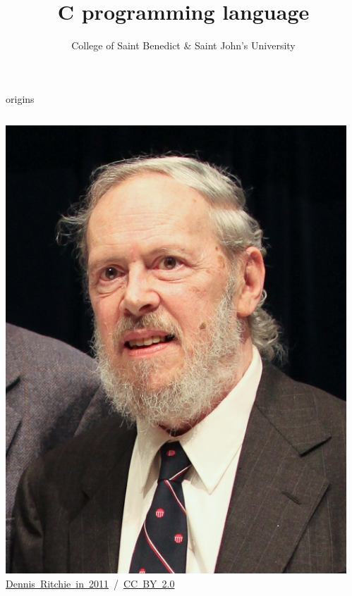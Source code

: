 \documentclass[10pt,t,svgnames]{beamer}
\title{C programming language}
\date{}
\author{College of Saint Benedict \& Saint John's University}
\begin{document}
  \maketitle

  \begin{frame}{origins}
    \vspace{3ex}
    \begin{columns}
      \begin{column}{.38425\textwidth}
        \includegraphics[width=\textwidth]{Dennis_Ritchie_2011.jpg}\\
        \hfill \tiny{\href{https://en.wikipedia.org/wiki/Dennis\_Ritchie\#/media/File:Dennis\_Ritchie\_2011.jpg}{Dennis~Ritchie~in~2011}~/~\href{http://creativecommons.org/licenses/by-sa/2.0}{CC~BY~2.0}}
      \end{column}
      \begin{column}{.51575\textwidth}

\end{column}
\end{columns}
\end{frame}
\end{document}
